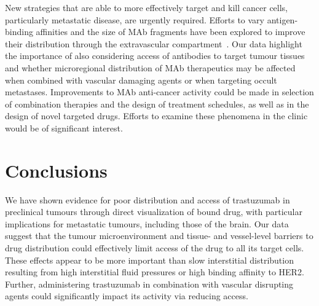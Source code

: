 
New strategies that are able to more effectively target and kill cancer cells, particularly metastatic disease, are urgently required.
Efforts to vary antigen-binding affinities and the size of \acs{MAb} fragments have been explored to improve their distribution through the extravascular compartment~\cite{Jain:2010ie,Chauhan:2011fi}.
Our data highlight the importance of also considering access of antibodies to target tumour tissues and whether microregional distribution of \acs{MAb} therapeutics may be affected when combined with vascular damaging agents or when targeting occult metastases.
Improvements to \acs{MAb} anti-cancer activity could be made in selection of combination therapies and the design of treatment schedules, as well as in the design of novel targeted drugs.
Efforts to examine these phenomena in the clinic would be of significant interest.

\section{Conclusions}
We have shown evidence for poor distribution and access of trastuzumab in preclinical tumours through direct visualization of bound drug, with particular implications for metastatic tumours, including those of the brain.
Our data suggest that the tumour microenvironment and tissue- and vessel-level barriers to drug distribution could effectively limit access of the drug to all its target cells.
These effects appear to be more important than slow interstitial distribution resulting from high interstitial fluid pressures or high binding affinity to \acs{HER2}.
Further, administering trastuzumab in combination with vascular disrupting agents could significantly impact its activity via reducing access.

\endinput